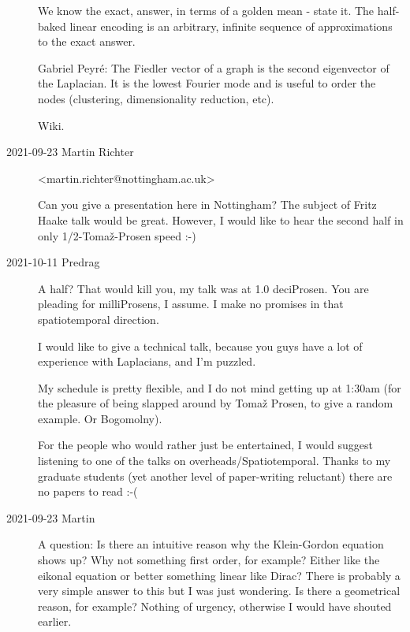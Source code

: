 \begin{description}
     {
We know the exact, {\AW} answer, in terms of a golden mean - state it.
The half-baked linear {encoding} is an arbitrary, infinite sequence of
approximations to the exact answer.
    }

     {
{Gabriel Peyr\'e}: The Fiedler vector of a graph is the second eigenvector
of the Laplacian. It is the lowest Fourier mode and is useful to
order the nodes (clustering, dimensionality reduction, etc).

 {Wiki}.
    }

\item[2021-09-23 Martin Richter] <martin.richter@nottingham.ac.uk>

Can you give a presentation here in Nottingham? The subject of Fritz
Haake talk would be great. However, I would like to hear the second half
in only 1/2-Toma\v{z}-Prosen speed :-)

\item[2021-10-11 Predrag]

A half? That would kill you, my talk was at 1.0 deciProsen. You are
pleading for milliProsens, I assume. I make no promises in that
spatiotemporal direction.

I would like to give a technical talk, because you guys have a lot of
experience with Laplacians, and I'm puzzled.

{My schedule}
is pretty flexible, and I do not mind getting up at 1:30am (for the
pleasure of being slapped around by Toma\v{z} Prosen, to give a random
example. Or Bogomolny).

For the people who would rather just be entertained, I would suggest
listening to one of the talks on
 {overheads/Spatiotemporal}.
Thanks to my graduate students (yet another level of
paper-writing reluctant) there are no papers to read :-(

\item[2021-09-23 Martin]
A question: Is there an intuitive reason why the Klein-Gordon equation
shows up? Why not something first order, for example? Either like the
eikonal equation or better something linear like Dirac? There is probably
a very simple answer to this but I was just wondering. Is there a
geometrical reason, for example? Nothing of urgency, otherwise I would
have shouted earlier.


\end{description}
